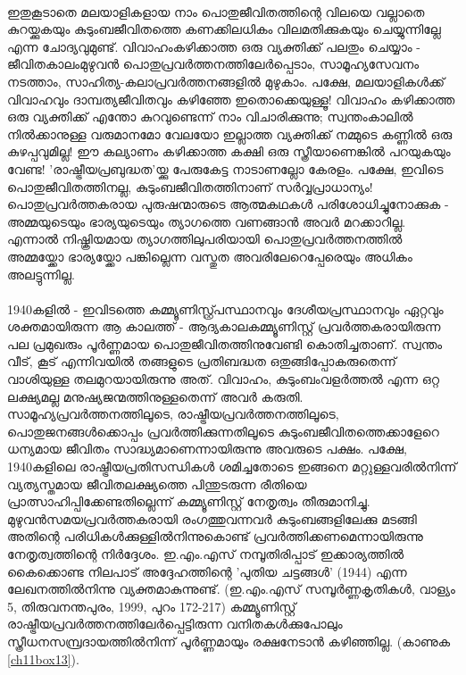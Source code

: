 \paragraph{}

ഇതുകൂടാതെ മലയാളികളായ നാം പൊതുജീവിതത്തിന്റെ വിലയെ വല്ലാതെ കുറയ്ക്കുകയും കുടുംബജീവിതത്തെ കണക്കിലധികം വിലമതിക്കുകയും ചെയ്യുന്നില്ലേ എന്ന ചോദ്യവുമുണ്ട്. വിവാഹംകഴിക്കാത്ത ഒരു വ്യക്തിക്ക് പലതും ചെയ്യാം - ജീവിതകാലംമുഴുവൻ പൊതുപ്രവർത്തനത്തിലേർപ്പെടാം, സാമൂഹ്യസേവനം നടത്താം, സാഹിത്യ-കലാപ്രവർത്തനങ്ങളിൽ മുഴുകാം. പക്ഷേ, മലയാളികൾക്ക് വിവാഹവും ദാമ്പത്യജീവിതവും കഴിഞ്ഞേ ഇതൊക്കെയുള്ളൂ! വിവാഹം കഴിക്കാത്ത ഒരു വ്യക്തിക്ക് എന്തോ കുറവുണ്ടെന്ന് നാം വിചാരിക്കുന്നു; സ്വന്തംകാലിൽ നിൽക്കാനുള്ള വരുമാനമോ വേലയോ ഇല്ലാത്ത വ്യക്തിക്ക് നമ്മുടെ കണ്ണിൽ ഒരു കുഴപ്പവുമില്ല! ഈ കല്യാണം കഴിക്കാത്ത കക്ഷി ഒരു സ്ത്രീയാണെങ്കിൽ പറയുകയും വേണ്ട! 'രാഷ്ട്രീയപ്രബുദ്ധത'യ്ക്കു പേരുകേട്ട നാടാണല്ലോ കേരളം. പക്ഷേ, ഇവിടെ പൊതുജീവിതത്തിനല്ല, കുടുംബജീവിതത്തിനാണ് സർവ്വപ്രാധാന്യം! പൊതുപ്രവർത്തകരായ പുരുഷന്മാരുടെ ആത്മകഥകൾ പരിശോധിച്ചുനോക്കുക - അമ്മയുടെയും ഭാര്യയുടെയും ത്യാഗത്തെ വണങ്ങാൻ അവർ മറക്കാറില്ല. എന്നാൽ നിഷ്ക്രിയമായ ത്യാഗത്തിലുപരിയായി പൊതുപ്രവർത്തനത്തിൽ അമ്മയ്ക്കോ ഭാര്യയ്ക്കോ പങ്കില്ലെന്ന വസ്തുത അവരിലേറെപ്പേരെയും അധികം അലട്ടുന്നില്ല.
\paragraph{}1940കളിൽ - ഇവിടത്തെ കമ്മ്യൂണിസ്റ്റ്പ്രസ്ഥാനവും ദേശീയപ്രസ്ഥാനവും ഏറ്റവും ശക്തമായിരുന്ന ആ കാലത്ത് - ആദ്യകാലകമ്മ്യൂണിസ്റ്റ് പ്രവർത്തകരായിരുന്ന പല പ്രമുഖരും പൂർണ്ണമായ പൊതുജീവിതത്തിനുവേണ്ടി കൊതിച്ചതാണ്. സ്വന്തം വീട്, കൂട് എന്നിവയിൽ തങ്ങളുടെ പ്രതിബദ്ധത ഒതുങ്ങിപ്പോകരുതെന്ന് വാശിയുള്ള തലമുറയായിരുന്നു അത്. വിവാഹം, കുടുംബംവളർത്തൽ എന്ന ഒറ്റ ലക്ഷ്യമല്ല മനുഷ്യജന്മത്തിനുള്ളതെന്ന് അവർ കരുതി. സാമൂഹ്യപ്രവർത്തനത്തിലൂടെ, രാഷ്ട്രീയപ്രവർത്തനത്തിലൂടെ, പൊതുജനങ്ങൾക്കൊപ്പം പ്രവർത്തിക്കുന്നതിലൂടെ കുടുംബജീവിതത്തെക്കാളേറെ ധന്യമായ ജീവിതം സാദ്ധ്യമാണെന്നായിരുന്നു അവരുടെ പക്ഷം. പക്ഷേ, 1940കളിലെ രാഷ്ട്രീയപ്രതിസന്ധികൾ ശമിച്ചതോടെ ഇങ്ങനെ മറ്റുള്ളവരിൽനിന്ന് വ്യത്യസ്തമായ ജീവിതലക്ഷ്യത്തെ പിന്തുടരുന്ന രീതിയെ പ്രാത്സാഹിപ്പിക്കേണ്ടതില്ലെന്ന് കമ്മ്യൂണിസ്റ്റ് നേതൃത്വം തീരുമാനിച്ചു. മുഴുവൻസമയപ്രവർത്തകരായി രംഗത്തുവന്നവർ കുടുംബങ്ങളിലേക്കു മടങ്ങി അതിന്റെ പരിധികൾക്കുള്ളിൽനിന്നുകൊണ്ട് പ്രവർത്തിക്കണമെന്നായിരുന്നു നേതൃത്വത്തിന്റെ നിർദ്ദേശം. ഇ.എം.എസ് നമ്പൂതിരിപ്പാട് ഇക്കാര്യത്തിൽ കൈക്കൊണ്ട നിലപാട് അദ്ദേഹത്തിന്റെ 'പുതിയ ചട്ടങ്ങൾ' (1944) എന്ന ലേഖനത്തിൽനിന്നു വ്യക്തമാകുന്നുണ്ട്. (ഇ.എം.എസ് സമ്പൂർണ്ണകൃതികൾ, വാള്യം 5, തിരുവനന്തപുരം, 1999, പുറം 172-217) കമ്മ്യൂണിസ്റ്റ് രാഷ്ട്രീയപ്രവർത്തനത്തിലേർപ്പെട്ടിരുന്ന വനിതകൾക്കുപോലും സ്ത്രീധനസമ്പ്രദായത്തിൽനിന്ന് പൂർണ്ണമായും രക്ഷനേടാൻ കഴിഞ്ഞില്ല. (കാണുക \ref{ch11box13}).

